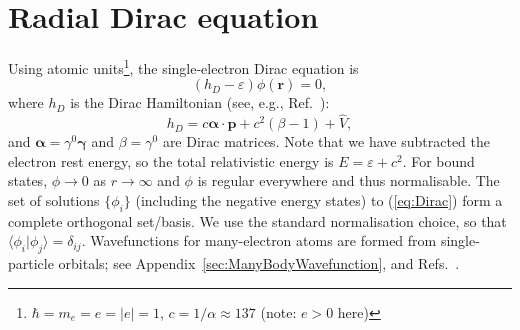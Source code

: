 \documentclass[10pt,twocolumn,a4paper]{article}%
\newcommand{\braket}[1]{\ensuremath{\langle #1\rangle}}	%
\renewcommand{\v}[1]{\ensuremath{\boldsymbol{#1}}}		%
\newcommand{\be}{\begin{equation}}
\newcommand{\ee}{\end{equation}}
\def\h{\ensuremath{\hbar}}
\def\en{\ensuremath{\varepsilon}}
\renewcommand{\b}{\ensuremath{\beta}}
\newcommand{\g}{\ensuremath{\gamma}}
\begin{document}


{\footnotesize
\tableofcontents
}

\section{Radial Dirac equation}


Using atomic units\footnote{$\h=m_e=e=|e|=1$, $c=1/\alpha\approx137$ (note: $e>0$ here)}, the single-electron Dirac equation is
\be\label{eq:Dirac}
\left(h_D - \en\right) \phi(\v{r}) = 0,
\ee
where $h_D$ is the Dirac Hamiltonian (see, e.g., Ref.~\cite{BetheBook}):
\be\label{eq:H-Dirac}
h_D = c \v{\alpha}\cdot\v{p} + c^2(\beta-1) + \hat V,
\ee
and $\v{\alpha} = \g^0\v{\g}$ and $\b=\g^0$ are Dirac matrices.
Note that we have subtracted the electron rest energy, so the total relativistic energy is $E = \en + c^2$.
For bound states, $\phi\to0$ as $r\to\infty$ and $\phi$ is regular everywhere and thus normalisable.
The set of solutions $\{\phi_i\}$ (including the negative energy states) to (\ref{eq:Dirac}) form a complete orthogonal set/basis.
We use the standard normalisation choice, so that $\braket{\phi_i|\phi_j} = \delta_{ij}$.
%
Wavefunctions for many-electron atoms are formed from single-particle orbitals; see Appendix~\ref{sec:ManyBodyWavefunction}, and Refs.~\cite{Lindgren1986,JohnsonBook2007}.
\end{document}
